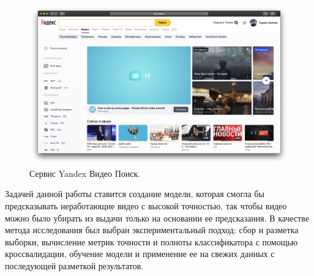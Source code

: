 \begin{figure}
    \centering
    \includegraphics[width=\textwidth]{images/yandex_video}
    \caption{Сервис Yandex Видео Поиск.}
    \label{fig:yandex_video}
\end{figure}

Задачей данной работы ставится создание модели, которая смогла бы предсказывать неработающие видео с высокой точностью, так чтобы видео можно было убирать из выдачи только на основании ее предсказания. В качестве метода исследования был выбран экспериментальный подход: сбор и разметка выборки, вычисление метрик точности и полноты классификатора с помощью кроссвалидации, обучение модели и применение ее на свежих данных с последующей разметкой результатов.